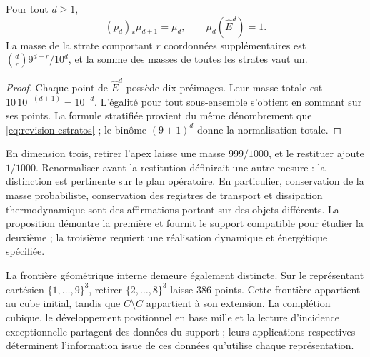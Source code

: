 \begin{samepage}
\begin{proposition}
Pour tout \(d\geq1\),
\[
 (p_d)_*\mu_{d+1}=\mu_d,
 \qquad \mu_d(\widehat E^d)=1.
\]
La masse de la strate comportant \(r\) coordonnées supplémentaires est
\(\binom dr9^{d-r}/10^d\), et la somme des masses de toutes les strates
vaut un.
\end{proposition}
\end{samepage}
\begin{proof}
Chaque point de \(\widehat E^d\) possède dix préimages. Leur masse totale est
\(10\,10^{-(d+1)}=10^{-d}\). L'égalité pour tout sous-ensemble
s'obtient en sommant sur ses points. La formule stratifiée provient
du même dénombrement que \eqref{eq:revision-estratos} ; le binôme
\((9+1)^d\) donne la normalisation totale.
\end{proof}

En dimension trois, retirer l'apex laisse une masse \(999/1000\), et
le restituer ajoute \(1/1000\). Renormaliser avant la restitution
définirait une autre mesure : la distinction est pertinente sur le plan opératoire.
En particulier, conservation de la masse probabiliste, conservation des
registres de transport et dissipation thermodynamique sont des affirmations portant sur
des objets différents. La proposition démontre la première et fournit le
support compatible pour étudier la deuxième ; la troisième requiert une
réalisation dynamique et énergétique spécifiée.

La frontière géométrique interne demeure également distincte.
Sur le représentant cartésien \(\{1,\ldots,9\}^3\), retirer
\(\{2,\ldots,8\}^3\) laisse \(386\) points. Cette frontière appartient au
cube initial, tandis que \(\widehat C\setminus C\) appartient à son
extension. La complétion cubique, le développement positionnel en base mille et
la lecture d'incidence exceptionnelle partagent des données du support ;
leurs applications respectives déterminent l'information issue de ces données qu'utilise
chaque représentation.
